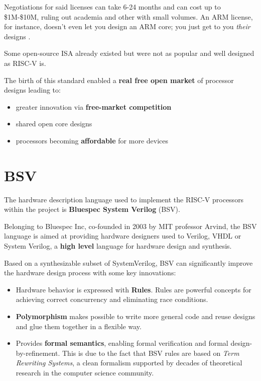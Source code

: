 \documentclass[12pt,oneside,a4paper]{article}
\begin{document}
Negotiations for said licenses can take 6-24 months and can cost up to \$1M-\$10M, ruling out academia and other with small volumes. An ARM license, for instance, doesn't even let you design an ARM core; you just get to you \textit{their} designs \cite{risc-v_free}.

Some open-source ISA already existed but were not as popular and well designed as RISC-V is.

The birth of this standard enabled a \textbf{real free open market} of processor designs leading to:
\begin{itemize}
	\item greater innovation via \textbf{free-market competition}
	\item shared open core designs
	\item processors becoming \textbf{affordable} for more devices
\end{itemize}

\section{BSV}
The hardware description language used to implement the RISC-V processors within the project is \textbf{Bluespec System Verilog} (BSV).

Belonging to Bluespec Inc, co-founded in 2003 by MIT professor Arvind, the BSV language is aimed at providing hardware designers used to Verilog, VHDL or System Verilog, a \textbf{high level} language for hardware design and synthesis.

Based on a synthesizable subset of SystemVerilog, BSV can significantly improve the hardware design process with some key innovations: 

\begin{itemize}
	\item Hardware behavior is expressed with \textbf{Rules}.
	Rules are powerful concepts for achieving correct concurrency and eliminating race conditions.
	\item \textbf{Polymorphism} makes possible to write more general code and reuse designs and glue them together in a flexible way.
	\item Provides \textbf{formal semantics}, enabling formal verification and formal design-by-refinement. This is due to the fact that BSV rules are based on \textit{Term Rewriting Systems}, a clean formalism supported by decades of theoretical research in the computer science community.
\end{itemize}
\end{document}
